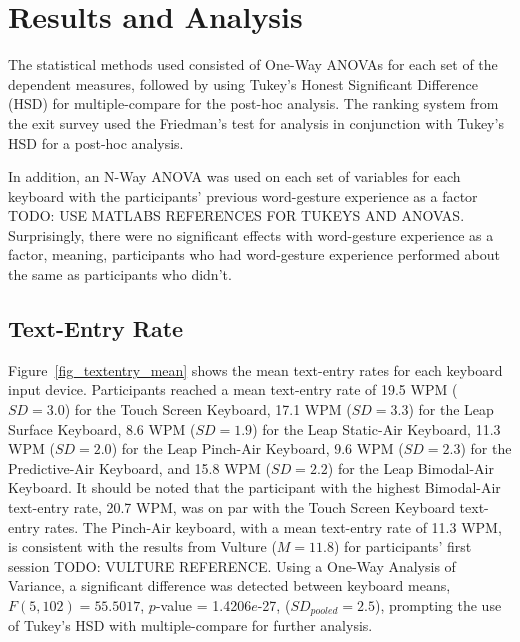 \chapter{Results and Analysis} \label{5_results}
The statistical methods used consisted of One-Way ANOVAs for each set of the dependent measures, followed by using Tukey's Honest Significant Difference (HSD) for multiple-compare for the post-hoc analysis. The ranking system from the exit survey used the Friedman's test for analysis in conjunction with Tukey's HSD for a post-hoc analysis.

In addition, an N-Way ANOVA was used on each set of variables for each keyboard with the participants' previous word-gesture experience as a factor TODO: USE MATLABS REFERENCES FOR TUKEYS AND ANOVAS. Surprisingly, there were no significant effects with word-gesture experience as a factor, meaning, participants who had word-gesture experience performed about the same as participants who didn't.

\section{Text-Entry Rate}
Figure~\ref{fig_textentry_mean} shows the mean text-entry rates for each keyboard input device. Participants reached a mean text-entry rate of 19.5 WPM ($SD = 3.0$) for the Touch Screen Keyboard, 17.1 WPM ($SD = 3.3$) for the Leap Surface Keyboard, 8.6 WPM ($SD = 1.9$) for the Leap Static-Air Keyboard, 11.3 WPM ($SD = 2.0$) for the Leap Pinch-Air Keyboard, 9.6 WPM ($SD = 2.3$) for the Predictive-Air Keyboard, and 15.8 WPM ($SD = 2.2$) for the Leap Bimodal-Air Keyboard. It should be noted that the participant with the highest Bimodal-Air text-entry rate, 20.7 WPM, was on par with the Touch Screen Keyboard text-entry rates. The Pinch-Air keyboard, with a mean text-entry rate of 11.3 WPM, is consistent with the results from Vulture ($M = 11.8$) for participants' first session TODO: VULTURE REFERENCE. Using a One-Way Analysis of Variance, a significant difference was detected between keyboard means, $F(5, 102) = 55.5017$, $p$-value = 1.4206$e$-27, ($SD_{pooled} = 2.5$), prompting the use of Tukey's HSD with multiple-compare for further analysis.

